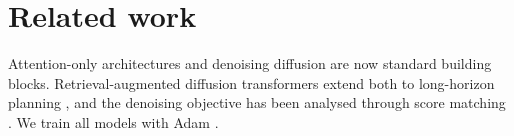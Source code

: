 \documentclass{article}
\begin{document}
\section{Related work}
Attention-only architectures \citep{vaswani2017attention} and denoising diffusion
\citep{ho2020denoising} are now standard building blocks. Retrieval-augmented diffusion
transformers extend both to long-horizon planning \citep{zhang2024retrieval}, and the
denoising objective has been analysed through score matching \citep{song2020denoising}.
We train all models with Adam \citep{kingma2011adam}.



\end{document}
